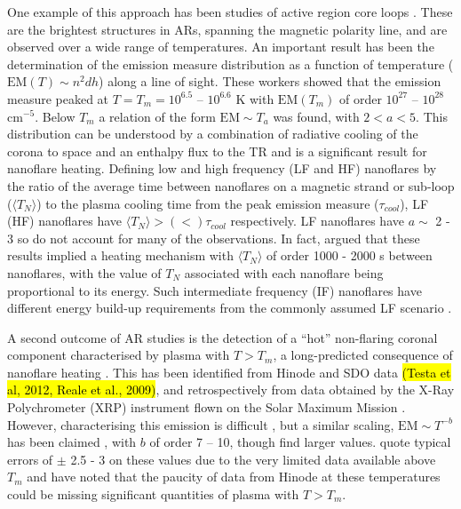 \documentclass[apj]{emulateapj}
\begin{document}
	\par One example of this approach has been studies of active region core loops \citep{warren_constraints_2011,warren_systematic_2012,winebarger_using_2011,tripathi_emission_2011,schmelz_cold_2012,bradshaw_diagnosing_2012,reep_diagnosing_2013,del_zanna_elemental_2014}. These are the brightest structures in ARs, spanning the magnetic polarity line, and are observed over a wide range of temperatures. An important result has been the determination of the emission measure distribution as a function of temperature ($\mathrm{EM}(T)\sim n^2dh$) along a line of sight. These workers showed that the emission measure peaked at $T = T_m = 10^{6.5}$ – $10^{6.6}$ K with $\mathrm{EM}(T_m)$ of order $10^{27}$ – $10^{28}$ cm$^{-5}$.  Below $T_m$ a relation of the form $\mathrm{EM} \sim T_a$ was found, with $2 < a < 5$. This distribution can be understood by a combination of radiative cooling of the corona to space and an enthalpy flux to the TR \citep[e.g.][]{bradshaw_new_2010,bradshaw_cooling_2010} and is a significant result for nanoflare heating. Defining low and high frequency (LF and HF) nanoflares by the ratio of the average time between nanoflares on a magnetic strand or sub-loop ($\langle T_N \rangle$) to the plasma cooling time from the peak emission measure ($\tau_{cool}$), LF (HF) nanoflares have $\langle T_N \rangle > (<) \tau_{cool}$ respectively. LF nanoflares have $a \sim$ 2 - 3 so do not account for many of the observations. In fact, \citet{cargill_active_2014} argued that these results implied a heating mechanism with $\langle T_N \rangle$ of order 1000 - 2000 s between nanoflares, with the value of $T_N$ associated with each nanoflare being proportional to its energy. Such intermediate frequency (IF) nanoflares have different energy build-up requirements from the commonly assumed LF scenario \citep{cargill_active_2014}.  
%
	\par A second outcome of AR studies is the detection of a ``hot'' non-flaring coronal component characterised by plasma with $T > T_m$, a long-predicted consequence of nanoflare heating \citep{cargill_implications_1994,cargill_diagnostics_1995}. This has been identified from Hinode and SDO data \hl{(Testa et al, 2012, Reale et al., 2009)}, and retrospectively from data obtained by the X-Ray Polychrometer (XRP) instrument flown on the Solar Maximum Mission \citep{del_zanna_elemental_2014}. However, characterising this emission is difficult \citep[e.g.][]{winebarger_defining_2012}, but a similar scaling, $\mathrm{EM} \sim T^{-b}$ has been claimed \citep[e.g.][]{warren_systematic_2012}, with $b$ of order 7 – 10, though \citet{del_zanna_elemental_2014} find larger values. \citeauthor{warren_systematic_2012} quote typical errors of $\pm$ 2.5 - 3 on these values due to the very limited data available above $T_m$ and \citet{winebarger_defining_2012} have noted that the paucity of data from Hinode at these temperatures could be missing significant quantities of plasma with $T > T_m$. 
\end{document}
